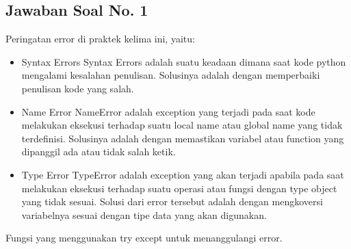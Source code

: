 \subsection{Jawaban Soal No. 1}
\hfill \break
Peringatan error di praktek kelima ini, yaitu:
\begin{itemize}
	\item Syntax Errors
	Syntax Errors adalah suatu keadaan dimana saat kode python mengalami kesalahan penulisan. Solusinya adalah dengan memperbaiki penulisan kode yang salah.
	\item Name Error
	NameError adalah exception yang terjadi pada saat kode melakukan eksekusi terhadap suatu local name atau global name yang tidak terdefinisi. Solusinya adalah dengan memastikan variabel atau function yang dipanggil ada atau tidak salah ketik.
	\item Type Error
	TypeError adalah exception yang akan terjadi apabila pada saat melakukan eksekusi terhadap suatu operasi atau fungsi dengan type object yang tidak sesuai. Solusi dari error tersebut adalah dengan mengkoversi variabelnya sesuai dengan tipe data yang akan digunakan.
\end{itemize}
\hfill \break
Fungsi yang menggunakan try except untuk menanggulangi error.

